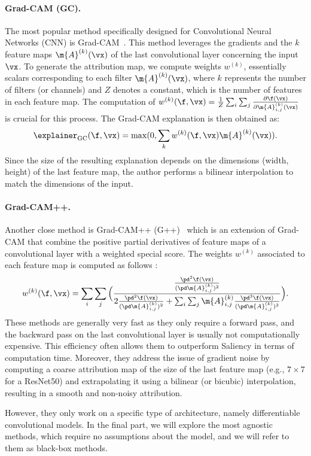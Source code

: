 \paragraph{Grad-CAM (GC).} The most popular method specifically designed for Convolutional Neural Networks (CNN) is Grad-CAM~\cite{Selvaraju_2019}. This method leverages the gradients and the $k$ feature maps $\m{A}^{(k)}(\vx)$ of the last convolutional layer concerning the input $\vx$. To generate the attribution map, we compute weights $w^{(k)}$, essentially scalars corresponding to each filter $\m{A}^{(k)}(\vx)$, where $k$ represents the number of filters (or channels) and $Z$ denotes a constant, which is the number of features in each feature map. The computation of $w^{(k)}(\f, \vx) = \frac{1}{Z} \sum_i \sum_j \frac{\partial \f(\vx)}{\partial \m{A}^{(k)}_{i,j}(\vx)}$ is crucial for this process. The Grad-CAM explanation is then obtained as:
$$\explainer_{\text{GC}}(\f, \vx) = \max(0, \sum_k w^{(k)}(\f,\vx) \m{A}^{(k)}(\vx)) .$$
Since the size of the resulting explanation depends on the dimensions (width, height) of the last feature map, the author performs a bilinear interpolation to match the dimensions of the input. 

\paragraph{Grad-CAM++.} Another close method is Grad-CAM++ (G++)~\cite{chattopadhay2018grad} which is an extension of Grad-CAM that combine the
positive partial derivatives of feature maps of a convolutional layer with a weighted special score. The weights $w^{(k)}$ associated to each feature map is computed as follows : 
$$w^{(k)}(\f, \vx) = 
    \sum_i \sum_j \Big(
    \frac{ \frac{\pd^2 \f(\vx) }{ (\pd \m{A}_{i,j}^{(k)})^2 } }
    { 2 \frac{\pd^2 \f(\vx) }{ (\pd \m{A}_{i,j}^{(k)})^2 } + \sum_i \sum_j \m{A}^{(k)}_{i,j}  \frac{\pd^3 \f(\vx) }{ (\pd \m{A}_{i,j}^{(k)})^3 } }
    \Big).
$$ 
These methods are generally very fast as they only require a forward pass, and the backward pass on the last convolutional layer is usually not computationally expensive. This efficiency often allows them to outperform Saliency in terms of computation time. Moreover, they address the issue of gradient noise by computing a coarse attribution map of the size of the last feature map (e.g., $7\times7$ for a ResNet50) and extrapolating it using a bilinear (or bicubic) interpolation, resulting in a smooth and non-noisy attribution.

However, they only work on a specific type of architecture, namely differentiable convolutional models. In the final part, we will explore the most agnostic methods, which require no assumptions about the model, and we will refer to them as black-box methods.


